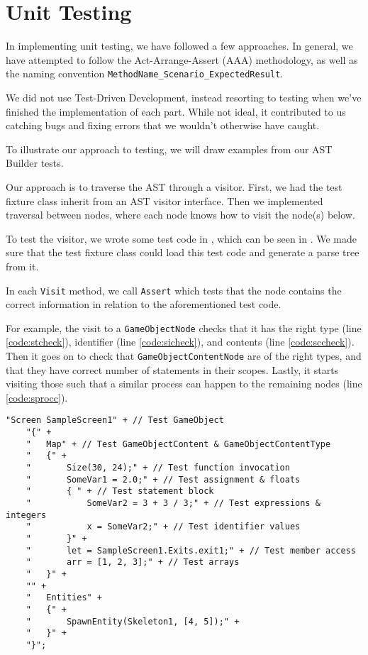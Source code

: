 \section{Unit Testing}
In implementing unit testing, we have followed a few approaches.
In general, we have attempted to follow the Act-Arrange-Assert (AAA)
methodology, as well as the naming convention 
\texttt{MethodName\_Scenario\_ExpectedResult}.

We did not use Test-Driven Development, instead resorting to testing
when we've finished the implementation of each part. While not ideal, it
contributed to us catching bugs and fixing errors that we wouldn't
otherwise have caught.

To illustrate our approach to testing, we will draw examples from our
AST Builder tests.

Our approach is to traverse the AST through a visitor. First,
we had the test fixture class inherit from an AST visitor interface.
Then we implemented traversal between nodes, where each node knows how
to visit the node(s) below.

To test the visitor, we wrote some test code in \dazel{}, which can be seen in . We made sure that
the test fixture class could load this test code and generate a parse
tree from it.

In each \texttt{Visit} method, we call \texttt{Assert} which tests
that the node contains the correct information in relation to the
aforementioned \dazel{} test code.

For example, the visit to a \texttt{GameObjectNode} checks that it has the
right type (line \ref{code:stcheck}), identifier (line \ref{code:sicheck}), and contents (line \ref{code:sccheck}). Then it goes on to check that
\texttt{GameObjectContentNode} are of the right types, and that they have
correct number of statements in their scopes. Lastly, it starts visiting
those such that a similar process can happen to the remaining nodes (line \ref{code:sprocc}).

\begin{lstlisting}[caption={AST Builder \dazel{} test code}, label={lst:asttestcode}]
    "Screen SampleScreen1" + // Test GameObject
    "{" +
    "   Map" + // Test GameObjectContent & GameObjectContentType
    "   {" +
    "       Size(30, 24);" + // Test function invocation
    "       SomeVar1 = 2.0;" + // Test assignment & floats
    "       { " + // Test statement block
    "           SomeVar2 = 3 + 3 / 3;" + // Test expressions & integers
    "           x = SomeVar2;" + // Test identifier values
    "       }" +
    "       let = SampleScreen1.Exits.exit1;" + // Test member access 
    "       arr = [1, 2, 3];" + // Test arrays
    "   }" +
    "" +
    "   Entities" +
    "   {" +
    "       SpawnEntity(Skeleton1, [4, 5]);" +
    "   }" +
    "}";
    \end{lstlisting}



